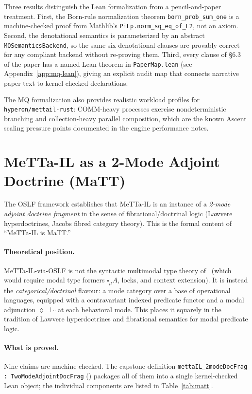 \documentclass[11pt]{article}
\newcommand{\code}[1]{\texttt{#1}}
\newcommand{\codepath}[1]{\path{#1}}
\begin{document}
Three results distinguish the Lean formalization from a pencil-and-paper treatment.
First, the Born-rule normalization theorem \code{born\_prob\_sum\_one} is a
machine-checked proof from Mathlib's \code{PiLp.norm\_sq\_eq\_of\_L2}, not an
axiom.  Second, the denotational semantics is parameterized by an abstract
\code{MQSemanticsBackend}, so the same six denotational clauses are provably correct
for any compliant backend without re-proving them.  Third, every clause of
\S{}6.3 of the paper has a named Lean theorem in \code{PaperMap.lean} (see
Appendix~\ref{app:mq-lean}), giving an explicit audit map that connects
narrative paper text to kernel-checked declarations.

The MQ formalization also provides realistic workload profiles for
\code{hyperon/mettail-rust}: COMM-heavy processes exercise nondeterministic
branching and collection-heavy parallel composition, which are the known Ascent
scaling pressure points documented in the engine performance notes.

\section{MeTTa-IL as a 2-Mode Adjoint Doctrine (MaTT)}
\label{sec:matt}

The OSLF framework establishes that MeTTa-IL is an instance of a
\emph{2-mode adjoint doctrine fragment} in the sense of
fibrational/doctrinal logic (Lawvere hyperdoctrines, Jacobs fibred
category theory).  This is the formal content of ``MeTTa-IL is MaTT.''

\paragraph{Theoretical position.}
MeTTa-IL-via-OSLF is not the syntactic multimodal type theory
of~\cite{gratzer2020multimodal} (which would require modal type formers
$\square_\mu A$, locks, and context extension).  It is instead the
\emph{categorical/doctrinal} flavour: a mode category over a base of
operational languages, equipped with a contravariant indexed predicate
functor and a modal adjunction $\lozenge \dashv \square$ at each
behavioral mode.  This places it squarely in the tradition of Lawvere
hyperdoctrines and fibrational semantics for modal predicate logic.

\paragraph{What is proved.}
Nine claims are machine-checked.
The capstone definition
\code{mettaIL\_2modeDocFrag : TwoModeAdjointDocFrag}
(\codepath{MATTFragment.lean}) packages all of them into a single
kernel-checked Lean object; the individual components are listed in
Table~\ref{tab:matt}.
\end{document}

